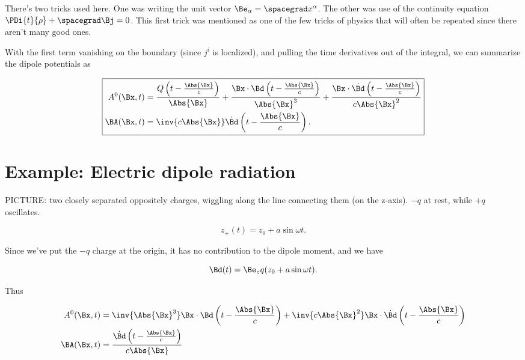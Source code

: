 There's two tricks used here.  One was writing the unit vector $\Be_\alpha = \spacegrad x^\alpha$.  The other was use of the continuity equation $\PDi{t}{\rho} + \spacegrad \Bj = 0$.  This first trick was mentioned as one of the few tricks of physics that will often be repeated since there aren't many good ones.

With the first term vanishing on the boundary (since $j^i$ is localized), and pulling the time derivatives out of the integral, we can summarize the dipole potentials as

\begin{equation}\label{eqn:relativisticElectrodynamicsL20:250}
\boxed{
\begin{aligned}
A^0(\Bx, t) &= \frac{Q\left(t - \frac{\Abs{\Bx}}{c}\right)}{\Abs{\Bx}} + \frac{\Bx \cdot \Bd\left(t - \frac{\Abs{\Bx}}{c}\right)}{\Abs{\Bx}^3} + \frac{\Bx \cdot \dot{\Bd}\left(t - \frac{\Abs{\Bx}}{c}\right)}{c \Abs{\Bx}^2} \\
\BA(\Bx, t) &= \inv{c \Abs{\Bx}} \dot{\Bd}\left(t - \frac{\Abs{\Bx}}{c}\right).
\end{aligned}
}
\end{equation}

\section{Example: Electric dipole radiation}

PICTURE: two closely separated oppositely charges, wiggling along the line connecting them (on the z-axis).  $-q$ at rest, while $+q$ oscillates.

\begin{equation}\label{eqn:relativisticElectrodynamicsL20:270}
z_+(t) = z_0 + a \sin\omega t.
\end{equation}

Since we've put the $-q$ charge at the origin, it has no contribution to the dipole moment, and we have

\begin{equation}\label{eqn:relativisticElectrodynamicsL20:290}
\Bd(t) = \Be_z q (z_0 + a \sin\omega t).
\end{equation}

Thus

\begin{align}\label{eqn:relativisticElectrodynamicsL20:310}
A^0(\Bx, t) &= \inv{\Abs{\Bx}^3} \Bx \cdot \Bd\left(t - \frac{\Abs{\Bx}}{c}\right) + \inv{c \Abs{\Bx}^2} \Bx \cdot \dot{\Bd}\left(t - \frac{\Abs{\Bx}}{c}\right) \\
\BA(\Bx, t) &= \frac{\dot{\Bd}\left(t - \frac{\Abs{\Bx}}{c}\right)}{c \Abs{\Bx}}
\end{align}

